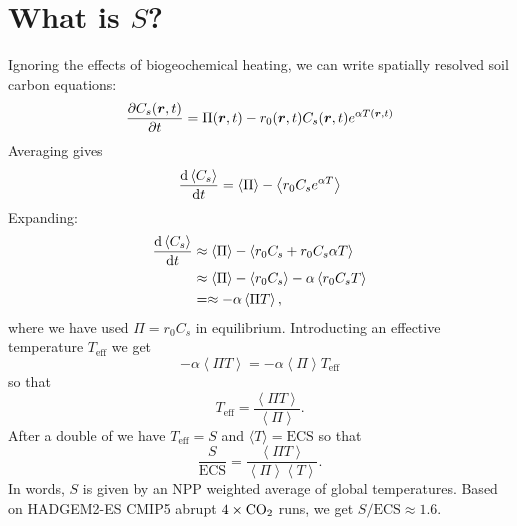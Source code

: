 \section{What is $S$?}
Ignoring the effects of biogeochemical heating, we can write spatially resolved soil carbon equations:
\begin{equation}
  \label{eq:spatially_resolved_soil_carbon}
  \pdv{ C_s (\bm{r},t)}{t} = \Pi(\bm{r},t) - r_0(\bm{r},t)C_s(\bm{r},t)e^{\alpha T(\bm{r},t)}
\end{equation}
Averaging gives
\begin{equation}
  \label{eq:spatially_averaged_soil_carbon}
  \dv{\left\langle C_s\right\rangle}{t} = \left\langle \Pi \right \rangle - \left\langle r_0 C_s e^{\alpha T} \right \rangle
\end{equation}
Expanding:
\begin{align*}
  \dv{\left\langle C_s\right\rangle}{t} &\approx \left\langle \Pi \right \rangle - \left\langle r_0 C_s + r_0 C_s \alpha T \right \rangle \\
                                        &\approx \left\langle \Pi \right \rangle - \left\langle r_0 C_s\right \rangle - \alpha \left \langle r_0C_s T\right\rangle \\
                                        &=\approx - \alpha \left \langle \Pi T\right\rangle,
\end{align*}
where we have used $\Pi = r_0C_s$ in equilibrium. Introducting an effective temperature $T_{\mathrm{eff}}$ we get
\begin{equation*}
  - \alpha \left \langle \Pi T \right\rangle = - \alpha \left \langle \Pi \right\rangle T_{\mathrm{eff}}
\end{equation*}
so that
\begin{equation}
  \label{eq:definition_of_effective_temperature}
  T_{\mathrm{eff}} = \frac{\left \langle \Pi T \right\rangle}{\left \langle \Pi \right\rangle}.
\end{equation}
After a double of  we have $T_{\mathrm{eff}} = S$ and $\langle T \rangle = \mathrm{ECS}$ so that
\begin{equation}
  \label{eq:S_vs_ECS}
  \frac{S}{\mathrm{ECS}} = \frac{\left \langle \Pi T \right\rangle}{\left \langle \Pi \right\rangle \left \langle T \right \rangle}.
\end{equation}
In words, $S$ is given by an NPP weighted average of global temperatures.
Based on HADGEM2-ES CMIP5 abrupt $4\times\ce{CO2}$ runs, we get $S/\mathrm{ECS} \approx 1.6$.
